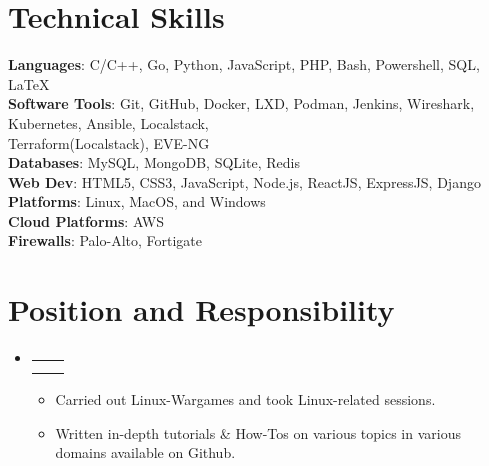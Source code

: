 \documentclass[letterpaper,11pt]{article}
\makeatletter
\newcommand{\resumeItem}[1]{
  \item\small{
    {#1 \vspace{-2pt}}
  }
}
\newcommand{\resumeSubheading}[4]{
  \vspace{-2pt}\item
    \begin{tabular*}{1.0\textwidth}[t]{l@{\extracolsep{\fill}}r}
      \textbf{#1} & \textbf{\small #2} \\
      \textit{\small#3} & \textit{\small #4} \\
    \end{tabular*}\vspace{-7pt}
}
\newcommand{\resumeSubHeadingListStart}{\begin{itemize}[leftmargin=0.0in, label={}]}
\newcommand{\resumeSubHeadingListEnd}{\end{itemize}}
\newcommand{\resumeItemListStart}{\begin{itemize}}
\newcommand{\resumeItemListEnd}{\end{itemize}\vspace{-5pt}}
\makeatother
\begin{document}
\section{Technical Skills}
 \begin{itemize}[leftmargin=0.15in, label={}]
    \small{\item{
     \textbf{Languages}{: \hspace{1.1cm}C/C++, Go, Python, JavaScript, PHP, Bash, Powershell, SQL, \LaTeX} \\
     \textbf{Software Tools}{: \hspace{0.3cm}Git, GitHub, Docker, LXD, Podman, Jenkins, Wireshark, Kubernetes, Ansible, Localstack,\\\hspace{3.05cm} Terraform(Localstack),  EVE-NG} \\
     \textbf{Databases}{: \hspace{1.15cm}MySQL, MongoDB, SQLite, Redis} \\
\textbf{Web Dev}{: \hspace{1.3cm}HTML5, CSS3, JavaScript, Node.js, ReactJS, ExpressJS, Django} \\
\textbf{Platforms}{: \hspace{1.2cm}Linux, MacOS, and Windows} \\
\textbf{Cloud Platforms}{: AWS} \\
\textbf{Firewalls}{: \hspace{1.35cm}Palo-Alto, Fortigate} \\
    }}
 \end{itemize}
 \vspace{-16pt}


\section{Position and Responsibility}
\vspace{-25pt}
    \resumeSubHeadingListStart
        \resumeSubheading{}{}{}{}
            \resumeItemListStart
                \resumeItem{Carried out Linux-Wargames and took Linux-related sessions.}
            \resumeItemListEnd
         \resumeItemListStart
                \resumeItem{Written in-depth tutorials  \& How-Tos on various topics in various domains available on Github.}
            \resumeItemListEnd
    \resumeSubHeadingListEnd
\end{document}
